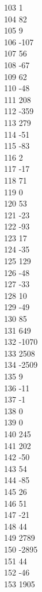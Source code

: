 { 103	1 \\
 104	82 \\
 105	9 \\
 106	-107 \\
 107	56 \\
 108	-67 \\
 109	62 \\
 110	-48 \\
 111	208 \\
 112	-359 \\
 113	279 \\
 114	-51 \\
 115	-83 \\
 116	2 \\
 117	-17 \\
 118	71 \\
 119	0 \\
 120	53 \\
 121	-23 \\
 122	-93 \\
 123	17 \\
 124	-35 \\
 125	129 \\
 126	-48 \\
 127	-33 \\
 128	10 \\
 129	-49 \\
 130	85 \\
 131	649 \\
 132	-1070 \\
 133	2508 \\
 134	-2509 \\
 135	9 \\
 136	-11 \\
 137	-1 \\
 138	0 \\
 139	0 \\
 140	245 \\
 141	202 \\
 142	-50 \\
 143	54 \\
 144	-85 \\
 145	26 \\
 146	51 \\
 147	-21 \\
 148	44 \\
 149	2789 \\
 150	-2895 \\
 151	44 \\
 152	-46 \\
 153	1905 \\
}
